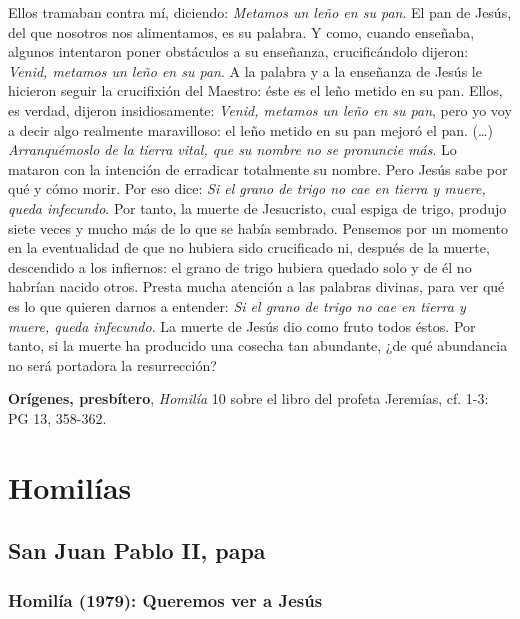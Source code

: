 \begin{patercite}
	[\ldots]  Ellos tramaban contra mí, diciendo: \textit{Metamos un leño en su pan}. El pan de Jesús, del que nosotros nos alimentamos, es su palabra. Y como, cuando enseñaba, algunos intentaron poner obstáculos a su enseñanza, crucificándolo dijeron: \textit{Venid, metamos un leño en su pan}. A la palabra y a la enseñanza de Jesús le hicieron seguir la crucifixión del Maestro: éste es el leño metido en su pan. Ellos, es verdad, dijeron insidiosamente: \textit{Venid, metamos un leño en su pan}, pero yo voy a decir algo realmente maravilloso: el leño metido en su pan mejoró el pan. (\ldots)  \textit{Arranquémoslo de la tierra vital, que su nombre no se pronuncie más}. Lo mataron con la intención de erradicar totalmente su nombre. Pero Jesús sabe por qué y cómo morir. Por eso dice: \textit{Si el grano de trigo no cae en tierra y muere, queda infecundo}. Por tanto, la muerte de Jesucristo, cual espiga de trigo, produjo siete veces y mucho más de lo que se había sembrado. Pensemos por un momento en la eventualidad de que no hubiera sido crucificado ni, después de la muerte, descendido a los infiernos: el grano de trigo hubiera quedado solo y de él no habrían nacido otros. Presta mucha atención a las palabras divinas, para ver qué es lo que quieren darnos a entender: \textit{Si el grano de trigo no cae en tierra y muere, queda infecundo}. La muerte de Jesús dio como fruto todos éstos. Por tanto, si la muerte ha producido una cosecha tan abundante, ¿de qué abundancia no será portadora la resurrección?
	
	\textbf{Orígenes, presbítero}, \textit{Homilía} 10 sobre el libro del profeta Jeremías, cf. 1-3: PG 13, 358-362.
\end{patercite}





\newsection
\section{Homilías}

\subsection{San Juan Pablo II, papa}

\subsubsection{Homilía (1979): Queremos ver a Jesús}

